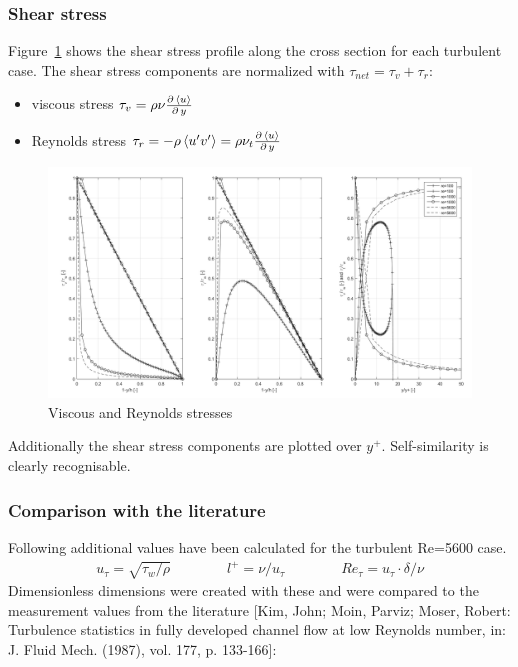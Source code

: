 \documentclass[11pt,a4paper]{article}
\begin{document}
\subsubsection{Shear stress}

Figure~\ref{fig:taus} shows the shear stress profile along the cross section for each turbulent case. The shear stress components are normalized with $\tau_{net}=\tau_v+\tau_r$:

\begin{itemize}
\item viscous stress $\tau_v=\rho\nu\frac{\partial \, \left\langle u\right\rangle}{\partial \, y}$
\item Reynolds stress $\tau_r=-\rho\left\langle u' v'\right\rangle=\rho\nu_t\frac{\partial \, \left\langle u\right\rangle}{\partial \, y}$
\end{itemize}

\begin{figure}[h]
    \centering
    \includegraphics[width=1.0\textwidth]{tau}
    \caption{Viscous and Reynolds stresses}
    \label{fig:taus}
\end{figure}

\noindent Additionally the shear stress components are plotted over $y^+$. Self-similarity is clearly recognisable.

\subsubsection{Comparison with the literature}\label{sec:lit}
Following additional values have been calculated for the turbulent Re=5600 case.
\begin{align}
u_\tau=\sqrt{\tau_w/\rho}
\qquad\qquad
l^+=\nu/u_\tau
\qquad\qquad
Re_\tau=u_\tau\cdot\delta/\nu
\end{align}
Dimensionless dimensions were created with these and were compared to the measurement values from the literature [Kim, John; Moin, Parviz; Moser, Robert: Turbulence statistics in fully developed channel flow at low Reynolds number, in: J. Fluid Mech. (1987), vol. 177, p. 133-166]:
\end{document}
